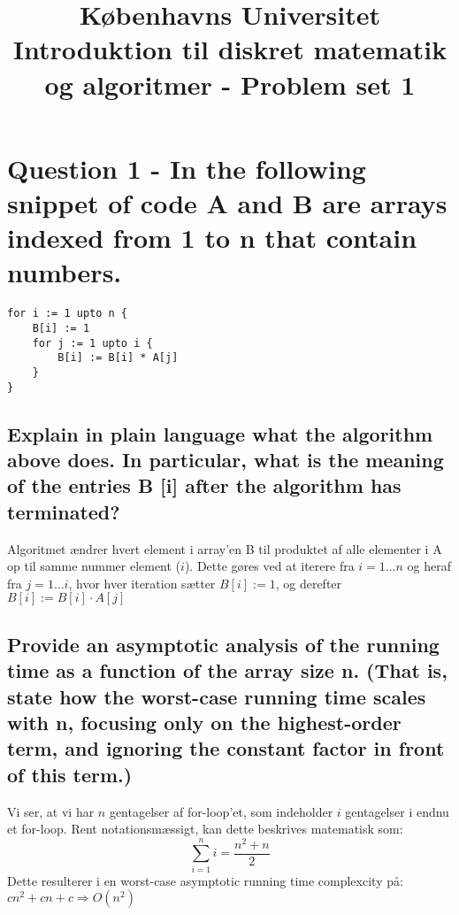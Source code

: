 \documentclass[a4paper,12pt]{article}
\begin{document}
% 

\title{Københavns Universitet\\
Introduktion til diskret matematik og algoritmer - Problem set 1}
\maketitle %

\section[Question 1]{Question 1 - In the following snippet of code A and B are arrays indexed from 1 to n that contain numbers. }

\begin{lstlisting}
for i := 1 upto n { 
    B[i] := 1 
    for j := 1 upto i {
        B[i] := B[i] * A[j] 
    }
} 
\end{lstlisting}

\subsection[]{Explain in plain language what the algorithm above does. In particular, what is the meaning of the entries B [i] after the algorithm has terminated? }

Algoritmet ændrer hvert element i array'en B til produktet af alle elementer i A op til samme nummer element ($i$). Dette gøres ved at iterere fra $i=1\dots n$ og heraf fra $j=1\dots  i$, hvor hver iteration sætter $B[i] := 1$, og derefter $B[i] := B[i] \cdot A[j]$

\subsection[]{Provide an asymptotic analysis of the running time as a function of the array size n. (That is, state how the worst-case running time scales with n, focusing only on the highest-order term, and ignoring the constant factor in front of this term.)}

Vi ser, at vi har $n$ gentagelser af for-loop'et, som indeholder $i$ gentagelser i endnu et for-loop. 
Rent notationsmæssigt, kan dette beskrives matematisk som:\\
\[\sum_{i=1}^{n}i=\dfrac{n^2+n}{2}\]
Dette resulterer i en worst-case asymptotic running time complexcity på: $cn^2 + cn + c \Rightarrow O(n^2)$
\end{document}
